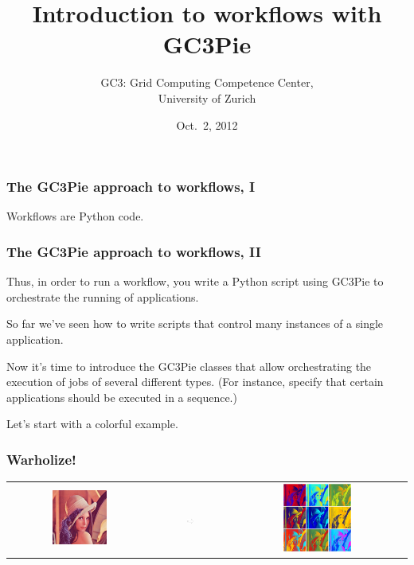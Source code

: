 \documentclass[english,serif,mathserif,xcolor=pdftex,dvipsnames,table]{beamer}
\title[Workflows]{%
  Introduction to workflows with GC3Pie
}
\author[Riccardo Murri]{%
  GC3: Grid Computing Competence Center, \\
  University of Zurich
}
\date{Oct.~2, 2012}
\begin{document}
\maketitle


\begin{frame}
  \frametitle{The GC3Pie approach to workflows, I}

  \begin{center}
    Workflows are Python code.
  \end{center}
\end{frame}


\begin{frame}
  \frametitle{The GC3Pie approach to workflows, II}

  Thus, in order to run a workflow, you write a Python script using
  GC3Pie to orchestrate the running of applications.

\end{frame}


\begin{frame}
  
So far we've seen how to write scripts that control many instances of
a single application.

\+ 
Now it's time to introduce the GC3Pie classes that allow
orchestrating the execution of jobs of several different types. (For
instance, specify that certain applications should be executed in a
sequence.)

\+
Let's start with a colorful example.
\end{frame}


\begin{frame}
  \frametitle{Warholize!}

  \begin{tabular}[c]{ccc}
  \includegraphics[width=0.4\textwidth]{fig/lena.jpg}
  &
  \includegraphics[width=0.1\textwidth]{fig/arrow.pdf}
  &
  \includegraphics[width=0.4\textwidth]{fig/warholized_lena.jpg}
  \end{tabular}
\end{frame}
\end{document}
